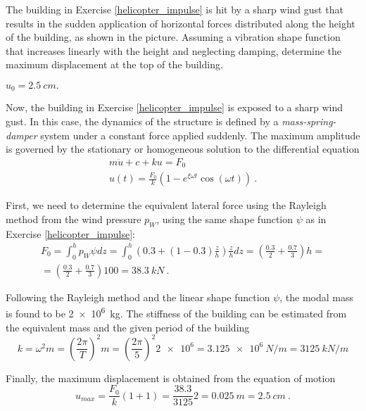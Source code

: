 
\begin{Exercise}[label={wind_gust_impulse}]
The building in Exercise \ref{helicopter_impulse} is hit by a sharp wind gust that results in the sudden application of horizontal forces distributed along the height of the building, as shown in the picture. Assuming a vibration shape function that increases linearly with the height and neglecting damping, determine the maximum displacement at the top of the building.

\begin{center}
\end{center}

\shortAnswer $u_0 = \SI{2.5}{cm}.$
\end{Exercise}



\begin{Answer}[ref={wind_gust_impulse}]
Now, the building in Exercise \ref{helicopter_impulse} is exposed to a sharp wind gust. In this case, the dynamics of the structure is defined by a \emph{mass-spring-damper} system under a constant force applied suddenly. The maximum amplitude is governed by the stationary or homogeneous solution to the differential equation
\begin{align*}
m\ddot{u} + c + ku = F_0 \\
u(t) = \frac{F_0}{k}(1 -e^{\xi\omega t}\cos(\omega t))\ .
\end{align*}

First, we need to determine the equivalent lateral force using the Rayleigh method from the wind pressure $p_W$, using the same shape function $\psi$ as in Exercise \ref{helicopter_impulse}:
\begin{align*}
F_0 = \int_0^h p_W\psi dz = \int_0^h \left(0.3 + (1-0.3)\frac{z}{h}\right)\frac{z}{h}dz = \left(\frac{0.3}{2} + \frac{0.7}{3}\right)h = \\
= \left(\frac{0.3}{2} + \frac{0.7}{3}\right)100 = \SI{38.3}{kN}\ .
\end{align*}

Following the Rayleigh method and the linear shape function $\psi$, the modal mass is found to be \SI{2e6}{kg}. The stiffness of the building can be estimated from the equivalent mass and the given period of the building
$$
k = \omega^2m = \left(\frac{2\pi}{T}\right)^2m = \left(\frac{2\pi}{5}\right)^2 \num{2e6} = \SI{3.125e6}{N/m} = \SI{3125}{kN/m}
$$

Finally, the maximum displacement is obtained from the equation of motion
$$
u_{max} = \frac{F_0}{k}(1+1) = \frac{38.3}{3125}2 = \SI{0.025}{m} = \SI{2.5}{cm}\ .
$$
\end{Answer}
